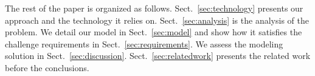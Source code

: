 

The rest of the paper is organized as follows. Sect.~\ref{sec:technology}
presents our approach and the technology it relies on. Sect.~\ref{sec:analysis}
is the analysis of the problem. We detail our model in Sect.~\ref{sec:model}
and show how it satisfies the challenge requirements in
Sect.~\ref{sec:requirements}. We assess the modeling solution in
Sect.~\ref{sec:discussion}. Sect.~\ref{sec:relatedwork} presents the related
work before the conclusions.%





